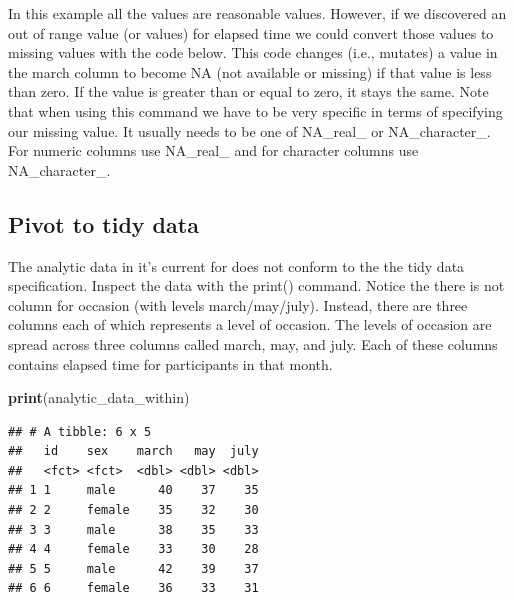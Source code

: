 \documentclass[
]{krantz}
\makeatletter
\newenvironment{Shaded}{\begin{snugshade}}{\end{snugshade}}
\newcommand{\DataTypeTok}[1]{\textcolor[rgb]{0.27,0.27,0.27}{#1}}
\newcommand{\DecValTok}[1]{\textcolor[rgb]{0.06,0.06,0.06}{#1}}
\newcommand{\KeywordTok}[1]{\textcolor[rgb]{0.27,0.27,0.27}{\textbf{#1}}}
\newcommand{\NormalTok}[1]{#1}
\newcommand{\OperatorTok}[1]{\textcolor[rgb]{0.43,0.43,0.43}{\textbf{#1}}}
\newcommand{\OtherTok}[1]{\textcolor[rgb]{0.37,0.37,0.37}{#1}}
\newcommand{\StringTok}[1]{\textcolor[rgb]{0.5,0.5,0.5}{#1}}
\newenvironment{kframe}{%
\medskip{}
\setlength{\fboxsep}{.8em}
 \def\at@end@of@kframe{}%
 \ifinner\ifhmode%
  \def\at@end@of@kframe{\end{minipage}}%
  \begin{minipage}{\columnwidth}%
 \fi\fi%
 \def\FrameCommand##1{\hskip\@totalleftmargin \hskip-\fboxsep
 \colorbox{shadecolor}{##1}\hskip-\fboxsep
     \hskip-\linewidth \hskip-\@totalleftmargin \hskip\columnwidth}%
 \MakeFramed {\advance\hsize-\width
   \@totalleftmargin\z@ \linewidth\hsize
   \@setminipage}}%
 {\par\unskip\endMakeFramed%
 \at@end@of@kframe}
\renewenvironment{Shaded}{\begin{kframe}}{\end{kframe}}
\makeatother
\begin{document}
In this example all the values are reasonable values. However, if we discovered an out of range value (or values) for elapsed time we could convert those values to missing values with the code below. This code changes (i.e., mutates) a value in the march column to become NA (not available or missing) if that value is less than zero. If the value is greater than or equal to zero, it stays the same. Note that when using this command we have to be very specific in terms of specifying our missing value. It usually needs to be one of NA\_real\_ or NA\_character\_. For numeric columns use NA\_real\_ and for character columns use NA\_character\_.

\begin{Shaded}
\end{Shaded}

\hypertarget{pivot-to-tidy-data}{%
\subsection{Pivot to tidy data}\label{pivot-to-tidy-data}}

The analytic data in it's current for does not conform to the the tidy data specification. Inspect the data with the print() command. Notice the there is not column for occasion (with levels march/may/july). Instead, there are three columns each of which represents a level of occasion. The levels of occasion are spread across three columns called march, may, and july. Each of these columns contains elapsed time for participants in that month.

\begin{Shaded}
\begin{Highlighting}[]
\KeywordTok{print}\NormalTok{(analytic_data_within)}
\end{Highlighting}
\end{Shaded}

\begin{verbatim}
## # A tibble: 6 x 5
##   id    sex    march   may  july
##   <fct> <fct>  <dbl> <dbl> <dbl>
## 1 1     male      40    37    35
## 2 2     female    35    32    30
## 3 3     male      38    35    33
## 4 4     female    33    30    28
## 5 5     male      42    39    37
## 6 6     female    36    33    31
\end{verbatim}
\end{document}
